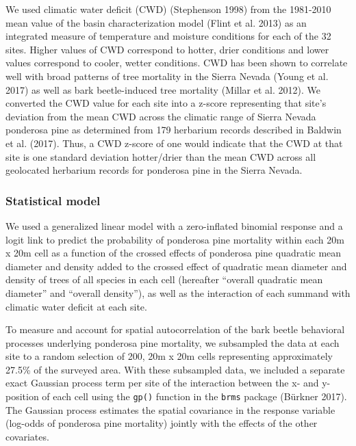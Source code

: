 \documentclass[]{article}
\begin{document}
We used climatic water deficit (CWD) (Stephenson 1998) from the
1981-2010 mean value of the basin characterization model (Flint et al.
2013) as an integrated measure of temperature and moisture conditions
for each of the 32 sites. Higher values of CWD correspond to hotter,
drier conditions and lower values correspond to cooler, wetter
conditions. CWD has been shown to correlate well with broad patterns of
tree mortality in the Sierra Nevada (Young et al. 2017) as well as bark
beetle-induced tree mortality (Millar et al. 2012). We converted the CWD
value for each site into a z-score representing that site's deviation
from the mean CWD across the climatic range of Sierra Nevada ponderosa
pine as determined from 179 herbarium records described in Baldwin et
al. (2017). Thus, a CWD z-score of one would indicate that the CWD at
that site is one standard deviation hotter/drier than the mean CWD
across all geolocated herbarium records for ponderosa pine in the Sierra
Nevada.

\subsubsection{Statistical model}\label{statistical-model}

We used a generalized linear model with a zero-inflated binomial
response and a logit link to predict the probability of ponderosa pine
mortality within each 20m x 20m cell as a function of the crossed
effects of ponderosa pine quadratic mean diameter and density added to
the crossed effect of quadratic mean diameter and density of trees of
all species in each cell (hereafter ``overall quadratic mean diameter''
and ``overall density''), as well as the interaction of each summand
with climatic water deficit at each site.

To measure and account for spatial autocorrelation of the bark beetle
behavioral processes underlying ponderosa pine mortality, we subsampled
the data at each site to a random selection of 200, 20m x 20m cells
representing approximately 27.5\% of the surveyed area. With these
subsampled data, we included a separate exact Gaussian process term per
site of the interaction between the x- and y-position of each cell using
the \texttt{gp()} function in the \texttt{brms} package (Bürkner 2017).
The Gaussian process estimates the spatial covariance in the response
variable (log-odds of ponderosa pine mortality) jointly with the effects
of the other covariates.
\end{document}
